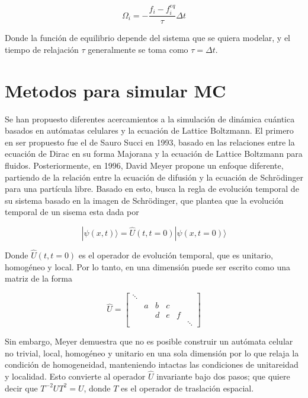 \documentclass[12pts, letterpaper, twocolumn]{article}
\begin{document}
\begin{equation*}
    \Omega_i = -\frac{f_i-f_i^{eq}}{\tau}\Delta t
\end{equation*}

Donde la función de equilibrio depende del sistema que se quiera modelar, y el tiempo de 
relajación $\tau$ generalmente se toma como $\tau=\Delta t$.

\section{Metodos para simular MC}
Se han propuesto diferentes acercamientos a la simulación de dinámica cuántica basados en 
autómatas celulares y la ecuación de Lattice Boltzmann. El primero en ser propuesto fue el 
de Sauro Succi en 1993, basado en las relaciones entre la ecuación de Dirac en su forma 
Majorana y la ecuación de Lattice Boltzmann para fluidos. Posteriormente, en 1996, David 
Meyer propone un enfoque diferente, partiendo de la relación entre la ecuación de difusión 
y la ecuación de Schrödinger para una partícula libre. Basado en esto, busca la regla de 
evolución temporal de su sistema basado en la imagen de Schrödinger, que plantea que la 
evolución temporal de un sisema esta dada por

\begin{equation}\label{eq:sch_im}
    |\psi(x,t)\rangle = \hat{U}(t, t=0)|\psi(x, t=0)\rangle
\end{equation}

Donde $\hat{U}(t, t=0)$ es el operador de evolución temporal, que es unitario, homogéneo y 
local. Por lo tanto, en una dimensión puede ser escrito como una matriz de la forma

\begin{equation*}
    \hat{U} = 
    \begin{bmatrix}
        \ddots & \\
        & a & b & c \\
        & & d & e & f \\
        & & & & & \ddots 
    \end{bmatrix}
\end{equation*}

Sin embargo, Meyer demuestra que no es posible construir un autómata celular no trivial, 
local, homogéneo y unitario en una sola dimensión \cite{meyer}por lo que relaja la 
condición de homogeneidad, manteniendo intactas las condiciones de unitareidad y localidad.
Esto convierte al operador $\hat{U}$ invariante bajo dos pasos; que quiere decir que 
$T^{-2}UT^2=U$, donde $T$ es el operador de traslación espacial.
\end{document}
